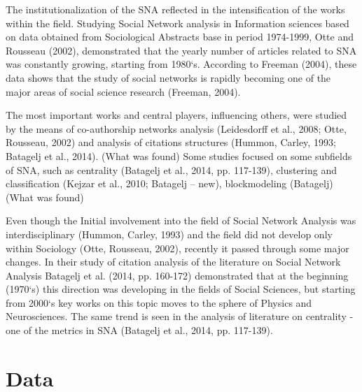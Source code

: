 \documentclass[11pt]{article} %
\begin{document}
The institutionalization of the SNA reflected in the intensification of the works within the field. Studying Social Network analysis in Information sciences based on data obtained from Sociological Abstracts base in period 1974-1999, Otte and Rousseau (2002), demonstrated that the yearly number of articles related to SNA was constantly growing, starting from 1980`s. According to Freeman (2004), these data shows that the study of social networks is rapidly becoming one of the major areas of social science research (Freeman, 2004).  \medskip 

The most important works and central players, influencing others, were studied by the means of co-authorship networks analysis (Leidesdorff et al., 2008; Otte, Rousseau, 2002) and analysis of citations structures (Hummon, Carley, 1993; Batagelj et al., 2014). (What was found)  Some studies focused on some subfields of SNA, such as centrality (Batagelj et al., 2014, pp. 117-139), clustering and classification (Kejzar et al., 2010; Batagelj – new), blockmodeling (Batagelj) (What was found) \medskip 

Even though the Initial involvement into the field of Social Network Analysis was interdisciplinary (Hummon, Carley, 1993) and the field did not develop only within Sociology (Otte, Rousseau, 2002), recently it passed through some major changes. In their study of citation analysis of the literature on Social Network Analysis Batagelj et al. (2014, pp. 160-172) demonstrated that at the beginning (1970`s) this direction was developing in the fields of Social Sciences, but starting from 2000`s key works on this topic moves to the sphere of Physics and Neurosciences. The same trend is seen in the analysis of literature on centrality - one of the metrics in SNA (Batagelj et al., 2014, pp. 117-139). \medskip  
 


\section{Data}
\end{document}
